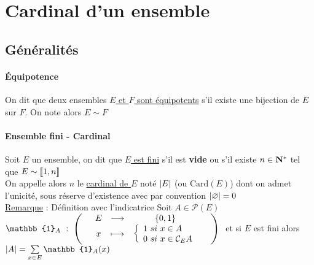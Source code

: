 

\minitoc
	\section{Cardinal d'un ensemble}
	\subsection{Généralités}
		\traitd
		\paragraph{Équipotence}
			On dit que deux ensembles \uline{$E$ et $F$ sont équipotents} s'il existe une bijection de $E$ sur $F$. On note alors $E\sim F$ \trait ${}$ \vspace*{-1.2cm} \traitd
		\paragraph{Ensemble fini - Cardinal}
			Soit $E$ un ensemble, on dit que \uline{$E$ est fini} s'il est \textbf{vide} ou s'il existe $n\in{\mathbf{N}}^*$ tel que $E\sim {\llbracket 1,n \rrbracket}$ \\
			On appelle alors $n$ le \uline{cardinal de $E$} noté $\left\vert E \right\vert$ (ou $\mathrm{Card}(E)$) dont on admet l'unicité, sous réserve d'existence avec par convention $\left\vert \varnothing  \right\vert = 0$  \trait
		\vspace*{0.5cm} \\  \vspace*{0.5cm} \newpage
		\uline{Remarque} : Définition avec l'indicatrice
		Soit $A\in \mathcal{P}(E)$ \vspace*{0.2cm} \\
		$\mathbb{1}_A ~:~\appli{E}{x}{ \{0,1 \} }{ \left\{ \ard 1~si~x\in A \\ 0 ~si~ x\in \mathcal{C}_EA \arf\right.} ~$ et si $E$ est fini alors  $\abs{A} = \sum\limits_{x\in E} \mathbb{1}_A (x)$
		\vspace*{0.5cm} \\ 
